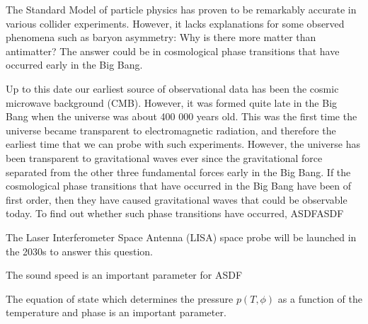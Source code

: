 \iffalse
Motivation
\begin{itemize}
    \item Standard model: matches observations but lacks important explanations
    \item Baryon asymmetry
    \item GWs: a window to physics beyond the SM
    \item By phase transitions
    \item LISA project
\end{itemize}

The thesis
\begin{itemize}
    \item Highlights from the work, especially the title / thesis statement
    \item Findings
    \item Conclusion
\end{itemize}

This is among the last sections to be written.
\fi

The Standard Model of particle physics has proven to be remarkably accurate in various collider experiments.
However, it lacks explanations for some observed phenomena such as baryon asymmetry: Why is there more matter than antimatter?
The answer could be in cosmological phase transitions that have occurred early in the Big Bang.

Up to this date our earliest source of observational data has been the cosmic microwave background (CMB).
However, it was formed quite late in the Big Bang when the universe was about 400 000 years old.
This was the first time the universe became transparent to electromagnetic radiation,
and therefore the earliest time that we can probe with such experiments.
However, the universe has been transparent to gravitational waves ever since the gravitational force separated from the other three fundamental forces early in the Big Bang.
If the cosmological phase transitions that have occurred in the Big Bang have been of first order,
then they have caused gravitational waves that could be observable today.
To find out whether such phase transitions have occurred,
ASDFASDF

The Laser Interferometer Space Antenna (LISA) space probe will be launched in the 2030s to answer this question.

The sound speed is an important parameter for ASDF

The equation of state which determines the pressure $p(T,\phi)$ as a function of the temperature and phase is an important parameter.

